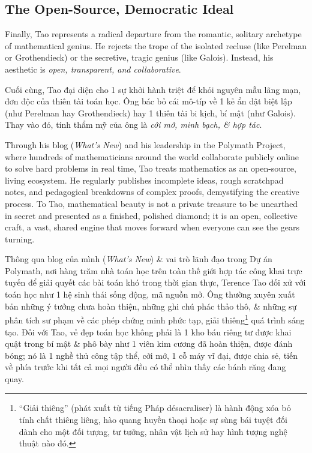 \documentclass[11pt]{article}
\begin{document}
\subsection{The Open-Source, Democratic Ideal}
Finally, Tao represents a radical departure from the romantic, solitary archetype of mathematical genius. He rejects the trope of the isolated recluse (like Perelman or Grothendieck) or the secretive, tragic genius (like Galois). Instead, his aesthetic is \emph{open, transparent, and collaborative}.

Cuối cùng, Tao đại diện cho 1 sự khởi hành triệt để khỏi nguyên mẫu lãng mạn, đơn độc của thiên tài toán học. Ông bác bỏ cái mô-típ về 1 kẻ ẩn dật biệt lập (như Perelman hay Grothendieck) hay 1 thiên tài bi kịch, bí mật (như Galois). Thay vào đó, tính thẩm mỹ của ông là \emph{cởi mở, minh bạch, \& hợp tác}.

Through his blog (\textit{What's New}) and his leadership in the Polymath Project, where hundreds of mathematicians around the world collaborate publicly online to solve hard problems in real time, Tao treats mathematics as an open-source, living ecosystem. He regularly publishes incomplete ideas, rough scratchpad notes, and pedagogical breakdowns of complex proofs, demystifying the creative process. To Tao, mathematical beauty is not a private treasure to be unearthed in secret and presented as a finished, polished diamond; it is an open, collective craft, a vast, shared engine that moves forward when everyone can see the gears turning.

Thông qua blog của mình (\textit{What's New}) \& vai trò lãnh đạo trong Dự án Polymath, nơi hàng trăm nhà toán học trên toàn thế giới hợp tác công khai trực tuyến để giải quyết các bài toán khó trong thời gian thực, Terence Tao đối xử với toán học như 1 hệ sinh thái sống động, mã nguồn mở. Ông thường xuyên xuất bản những ý tưởng chưa hoàn thiện, những ghi chú phác thảo thô, \& những sự phân tích sư phạm về các phép chứng minh phức tạp, giải thiêng\footnote{``Giải thiêng'' (phát xuất từ tiếng Pháp désacraliser) là hành động xóa bỏ tính chất thiêng liêng, hào quang huyền thoại hoặc sự sùng bái tuyệt đối dành cho một đối tượng, tư tưởng, nhân vật lịch sử hay hình tượng nghệ thuật nào đó.} quá trình sáng tạo. Đối với Tao, vẻ đẹp toán học không phải là 1 kho báu riêng tư được khai quật trong bí mật \& phô bày như 1 viên kim cương đã hoàn thiện, được đánh bóng; nó là 1 nghề thủ công tập thể, cởi mở, 1 cỗ máy vĩ đại, được chia sẻ, tiến về phía trước khi tất cả mọi người đều có thể nhìn thấy các bánh răng đang quay.
\end{document}
